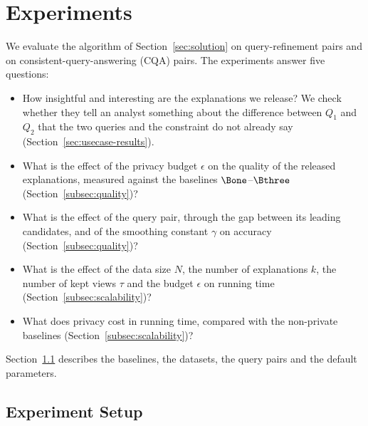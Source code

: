 \section{Experiments}
\label{sec:experiments}
\label{sec:usecases}

We evaluate the algorithm of Section~\ref{sec:solution} on query-refinement pairs and on consistent-query-answering (CQA) pairs.
The experiments answer five questions:
\begin{itemize}[leftmargin=*,itemsep=1pt,topsep=2pt]
  \item[\textbf{(E1)}] How insightful and interesting are the explanations we release? We check whether they tell an analyst something about the difference between $Q_1$ and $Q_2$ that the two queries and the constraint do not already say (Section~\ref{sec:usecase-results}).
  \item[\textbf{(E2)}] What is the effect of the privacy budget $\epsilon$ on the quality of the released explanations, measured against the baselines $\Bone$--$\Bthree$ (Section~\ref{subsec:quality})?
  \item[\textbf{(E3)}] What is the effect of the query pair, through the gap between its leading candidates, and of the smoothing constant $\gamma$ on accuracy (Section~\ref{subsec:quality})?
  \item[\textbf{(E4)}] What is the effect of the data size $N$, the number of explanations $k$, the number of kept views $\tau$ and the budget $\epsilon$ on running time (Section~\ref{subsec:scalability})?
  \item[\textbf{(E5)}] What does privacy cost in running time, compared with the non-private baselines (Section~\ref{subsec:scalability})?
\end{itemize}
Section~\ref{subsec:exp-setup} describes the baselines, the datasets, the query pairs and the default parameters.

\subsection{Experiment Setup}
\label{subsec:exp-setup}

